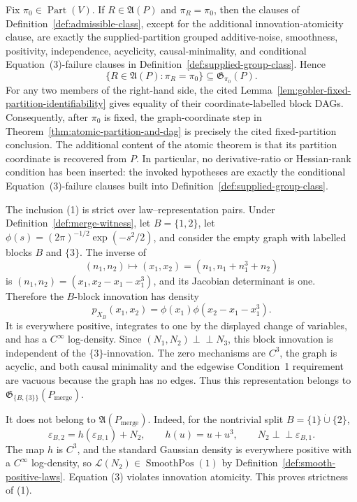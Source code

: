 Fix \(\pi_0\in\operatorname{Part}(V)\). If \(R\in\mathfrak A(P)\) and \(\pi_R=\pi_0\), then the clauses of Definition~\ref{def:admissible-class}, except for the additional innovation-atomicity clause, are exactly the supplied-partition grouped additive-noise, smoothness, positivity, independence, acyclicity, causal-minimality, and conditional Equation~(3)-failure clauses in Definition~\ref{def:supplied-group-class}. Hence
\[
\{R\in\mathfrak A(P):\pi_R=\pi_0\}
\subseteq \mathfrak G_{\pi_0}(P). \tag{1}
\]
For any two members of the right-hand side, the cited Lemma~\ref{lem:gobler-fixed-partition-identifiability} gives equality of their coordinate-labelled block DAGs. Consequently, after \(\pi_0\) is fixed, the graph-coordinate step in Theorem~\ref{thm:atomic-partition-and-dag} is precisely the cited fixed-partition conclusion. The additional content of the atomic theorem is that its partition coordinate is recovered from \(P\). In particular, no derivative-ratio or Hessian-rank condition has been inserted: the invoked hypotheses are exactly the conditional Equation~(3)-failure clauses built into Definition~\ref{def:supplied-group-class}.

The inclusion (1) is strict over law--representation pairs. Under Definition~\ref{def:merge-witness}, let \(B=\{1,2\}\), let \(\phi(s)=(2\pi)^{-1/2}\exp(-s^2/2)\), and consider the empty graph with labelled blocks \(B\) and \(\{3\}\). The inverse of
\[
(n_1,n_2)\longmapsto (x_1,x_2)=(n_1,n_1+n_1^3+n_2)
\]
is \((n_1,n_2)=(x_1,x_2-x_1-x_1^3)\), and its Jacobian determinant is one. Therefore the \(B\)-block innovation has density
\[
p_{X_B}(x_1,x_2)=\phi(x_1)\phi(x_2-x_1-x_1^3). \tag{2}
\]
It is everywhere positive, integrates to one by the displayed change of variables, and has a \(C^\infty\) log-density. Since \((N_1,N_2)\perp\!\!\!\perp N_3\), this block innovation is independent of the \(\{3\}\)-innovation. The zero mechanisms are \(C^3\), the graph is acyclic, and both causal minimality and the edgewise Condition~1 requirement are vacuous because the graph has no edges. Thus this representation belongs to \(\mathfrak G_{\{B,\{3\}\}}(P_{\mathrm{merge}})\).

It does not belong to \(\mathfrak A(P_{\mathrm{merge}})\). Indeed, for the nontrivial split \(B=\{1\}\mathbin{\dot\cup}\{2\}\),
\[
\varepsilon_{B,2}=h(\varepsilon_{B,1})+N_2,
\qquad h(u)=u+u^3,
\qquad N_2\perp\!\!\!\perp\varepsilon_{B,1}. \tag{3}
\]
The map \(h\) is \(C^3\), and the standard Gaussian density is everywhere positive with a \(C^\infty\) log-density, so \(\mathcal L(N_2)\in\operatorname{SmoothPos}(1)\) by Definition~\ref{def:smooth-positive-laws}. Equation (3) violates innovation atomicity. This proves strictness of (1).

